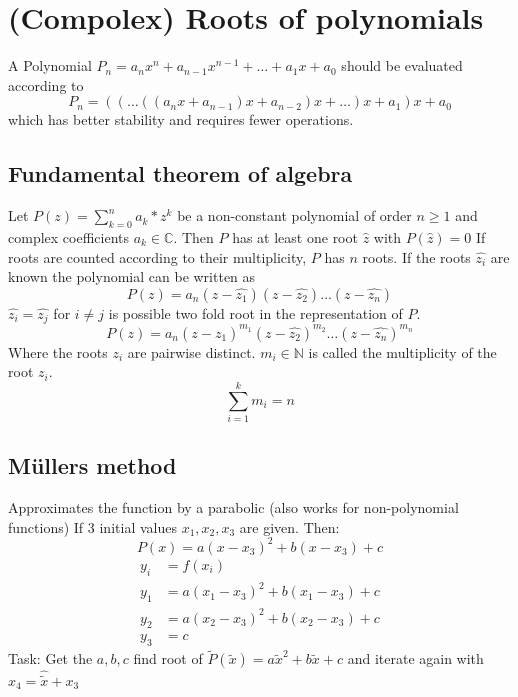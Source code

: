 \chapter{(Compolex) Roots of polynomials}\label{ch:(compolex)-roots-of-polynomials}
A Polynomial $P_n = a_n x^n+a_{n-1}x^{n-1}+\ldots+a_1 x+a_0$
should be evaluated according to
\begin{equation*}
    P_n = ((\ldots((a_n x+a_{n-1})x+a_{n-2})x+\ldots)x+a_1)x+a_0
\end{equation*}
which has better stability and requires fewer operations.


\section{Fundamental theorem of algebra}\label{sec:fundamental-theorem-of-algebra}
Let $P(z)=\sum_{k=0}^n a_k*z^k$ be a non-constant polynomial of order $n \geq 1$
and complex coefficients $a_k \in \mathbb{C}$.
Then $P$ has at least one root $\hat{z}$ with $P(\hat{z})=0$
If roots are counted according to their multiplicity, $P$ has $n$ roots.
If the roots $\hat{z_i}$ are known the polynomial can be written as
\begin{equation*}
    P(z)=a_n(z-\hat{z_1})(z-\hat{z_2})\ldots(z-\hat{z_n})
\end{equation*}
$\hat{z_i} = \hat{z_j}$ for $i \neq j$ is possible \textrightarrow{} two fold root in the representation of $P$.
\begin{equation*}
    P(z) = a_n(z-\hat{z_1})^{m_1}(z-\hat{z_2})^{m_2}\ldots (z-\hat{z_n})^{m_n}
\end{equation*}
Where the roots $z_i$ are pairwise distinct.
$m_i \in \mathbb{N}$ is called the multiplicity of the root $z_i$.
\begin{equation*}
    \sum_{i=1}^{k}m_i = n
\end{equation*}


\section{Müllers method}\label{sec:mullers-method}
Approximates the function by a parabolic (also works for non-polynomial functions)
If 3 initial values $x_1, x_2, x_3$ are given.
Then:
\begin{equation*}
    P(x)=a(x-x_3)^2+b(x-x_3)+c
\end{equation*}
\begin{align*}
    y_i &= f(x_i)\\
    y_1 &= a(x_1-x_3)^2+b(x_1-x_3)+c\\
    y_2 &=a(x_2-x_3)^2+b(x_2-x_3)+c\\
    y_3 &=c
\end{align*}
Task: Get the $a,b,c$ find root of $\tilde{P}(\tilde{x})=a\tilde{x}^2+b\tilde{x}+c$ and iterate again with
$x_4 = \hat{\tilde{x}}+x_3$

